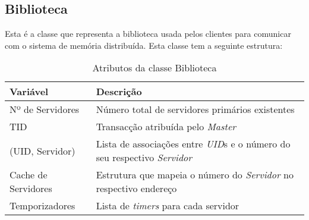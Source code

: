 \subsection{Biblioteca}
Esta é a classe que representa a biblioteca usada pelos clientes para comunicar com o sistema de memória distribuída. Esta classe tem a seguinte estrutura:

\begin{table}[H]
\centering
\begin{tabular}{| p{2cm} | p{} |}
\hline
\textbf{Variável} & \textbf{Descrição} \\
\hline
Nº de Servidores & Número total de servidores primários existentes  \\
\hline
TID & Transacção atribuída pelo \textit{Master} \\
\hline
(UID, Servidor) & Lista de associações entre \textit{UID}s e o número do seu respectivo \textit{Servidor} \\
\hline
Cache de Servidores & Estrutura que mapeia o número do \textit{Servidor} no respectivo endereço \\
\hline
Temporizadores & Lista de \textit{timers} para cada servidor \\
\hline
\end{tabular}
\caption{Atributos da classe Biblioteca} \label{lib}
\end{table}

